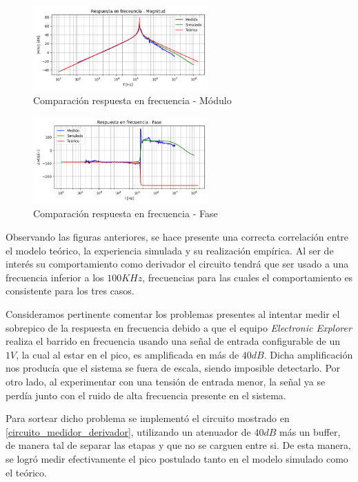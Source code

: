 \begin{figure}[H]
    \centering
    \includegraphics[width=0.6\textwidth]{../Ejercicio3-CircuitoIntegradoresyDerivadores/Imagenes/Derivador/comparacion_magnitud.png}
    \caption{Comparación respuesta en frecuencia - Módulo}
    \label{graph_trans_mag}
\end{figure}
\begin{figure}[H]
    \centering
    \includegraphics[width=0.6\textwidth]{../Ejercicio3-CircuitoIntegradoresyDerivadores/Imagenes/Derivador/comparacion_fase.png}
    \caption{Comparación respuesta en frecuencia - Fase}
    \label{graph_trans_pha}
\end{figure}
Observando las figuras anteriores, se hace presente una correcta correlación entre
el modelo teórico, la experiencia simulada y su realización empírica.
Al ser de interés su comportamiento como derivador el circuito tendrá que ser usado a una 
frecuencia inferior a los $100 KHz$, frecuencias para las cuales el comportamiento es 
consistente para los tres casos. \par 

Consideramos pertinente comentar los problemas presentes al intentar medir el sobrepico de la respuesta en frecuencia
debido a que el equipo \textit{Electronic Explorer} realiza el barrido en frecuencia usando una señal de entrada configurable
de un $1V$, la cual al estar en el pico, es amplificada en más de $40dB$. Dicha amplificación
nos producía que el sistema se fuera de escala, siendo imposible 
detectarlo. Por otro lado, al experimentar con una tensión de entrada menor, la señal ya se perdía junto con
el ruido  de alta frecuencia presente en el sistema. \par  Para sortear dicho problema
se implementó el circuito mostrado en \ref{circuito_medidor_derivador}, utilizando un atenuador de $40dB$ más un buffer,
de manera tal de separar las etapas y que no se carguen entre si. De esta manera, se logró medir efectivamente el pico 
postulado tanto en el modelo simulado como el teórico.

